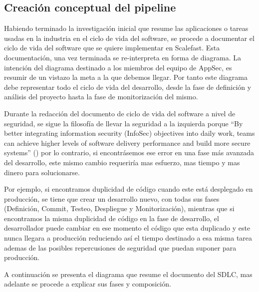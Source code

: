 \documentclass[12pt]{report} %
\begin{document}
\subsection{Creación conceptual del pipeline}

Habiendo terminado la investigación inicial que resume las aplicaciones o tareas
usadas en la industria en el ciclo de vida del software, se procede a documentar
el ciclo de vida del software que se quiere implementar en Scalefast.
Esta documentación, una vez terminada se re-interpreta en forma de diagrama.
La intención del diagrama destinado a los miembros del equipo de
\acrfull{AppSec}, es resumir de un vistazo la meta a la que debemos llegar.
Por tanto este diagrama debe representar todo el ciclo de vida del desarrollo,
desde la fase de definición y análisis del proyecto hasta la fase de
monitorización del mismo.
 
Durante la redacción del documento de ciclo de vida del software a nivel de
seguridad, se sigue la filosofía de llevar la seguridad a la izquierda porque
``By better integrating information security (InfoSec) objectives into daily
work, teams can achieve higher levels of software delivery performance and build
more secure systems'' (\cite{GoogleDOT})
por lo contrario, si encontrásemos ese error en una fase más avanzada del
desarrollo, este mismo cambio requeriría mas esfuerzo, mas tiempo y mas dinero
para solucionarse.

Por ejemplo, si encontramos duplicidad de código cuando este está desplegado en
producción, se tiene que crear un desarrollo nuevo, con todas sus fases
(Definición, Commit, Testeo, Despliegue y Monitorización), mientras que si
encontramos la misma duplicidad de código en la fase de desarrollo, el
desarrollador puede cambiar en ese momento el código que esta duplicado y este
nunca llegara a producción reduciendo así el tiempo destinado a esa misma tarea
ademas de las posibles repercusiones de seguridad que puedan suponer para
producción. 

A continuación se presenta el diagrama que resume el documento del \gls{SDLC},
mas adelante se procede a explicar sus fases y composición.
\end{document}
